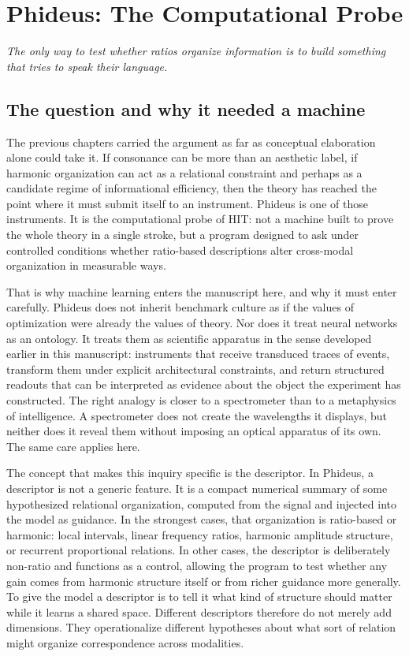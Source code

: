 \chapter{Phideus: The Computational Probe}

\epigraph{\emph{The only way to test whether ratios organize information is to build something that tries to speak their language.}}{}



\section{The question and why it needed a machine}


The previous chapters carried the argument as far as conceptual elaboration alone could take it. If consonance can be more than an aesthetic label, if harmonic organization can act as a relational constraint and perhaps as a candidate regime of informational efficiency, then the theory has reached the point where it must submit itself to an instrument. Phideus is one of those instruments. It is the computational probe of HIT: not a machine built to prove the whole theory in a single stroke, but a program designed to ask under controlled conditions whether ratio-based descriptions alter cross-modal organization in measurable ways.

That is why machine learning enters the manuscript here, and why it must enter carefully. Phideus does not inherit benchmark culture as if the values of optimization were already the values of theory. Nor does it treat neural networks as an ontology. It treats them as scientific apparatus in the sense developed earlier in this manuscript: instruments that receive transduced traces of events, transform them under explicit architectural constraints, and return structured readouts that can be interpreted as evidence about the object the experiment has constructed. The right analogy is closer to a spectrometer than to a metaphysics of intelligence. A spectrometer does not create the wavelengths it displays, but neither does it reveal them without imposing an optical apparatus of its own. The same care applies here.

The concept that makes this inquiry specific is the descriptor. In Phideus, a descriptor is not a generic feature. It is a compact numerical summary of some hypothesized relational organization, computed from the signal and injected into the model as guidance. In the strongest cases, that organization is ratio-based or harmonic: local intervals, linear frequency ratios, harmonic amplitude structure, or recurrent proportional relations. In other cases, the descriptor is deliberately non-ratio and functions as a control, allowing the program to test whether any gain comes from harmonic structure itself or from richer guidance more generally. To give the model a descriptor is to tell it what kind of structure should matter while it learns a shared space. Different descriptors therefore do not merely add dimensions. They operationalize different hypotheses about what sort of relation might organize correspondence across modalities.

